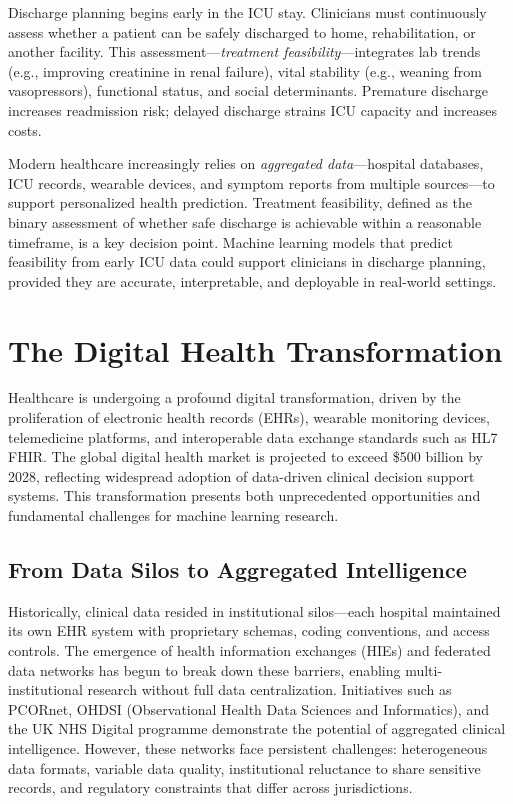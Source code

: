 Discharge planning begins early in the ICU stay. Clinicians must continuously assess whether a patient can be safely discharged to home, rehabilitation, or another facility. This assessment---\emph{treatment feasibility}---integrates lab trends (e.g., improving creatinine in renal failure), vital stability (e.g., weaning from vasopressors), functional status, and social determinants. Premature discharge increases readmission risk; delayed discharge strains ICU capacity and increases costs.

Modern healthcare increasingly relies on \emph{aggregated data}---hospital databases, ICU records, wearable devices, and symptom reports from multiple sources---to support personalized health prediction. Treatment feasibility, defined as the binary assessment of whether safe discharge is achievable within a reasonable timeframe, is a key decision point. Machine learning models that predict feasibility from early ICU data could support clinicians in discharge planning, provided they are accurate, interpretable, and deployable in real-world settings.

\section{The Digital Health Transformation}

Healthcare is undergoing a profound digital transformation, driven by the proliferation of electronic health records (EHRs), wearable monitoring devices, telemedicine platforms, and interoperable data exchange standards such as HL7 FHIR. The global digital health market is projected to exceed \$500 billion by 2028, reflecting widespread adoption of data-driven clinical decision support systems. This transformation presents both unprecedented opportunities and fundamental challenges for machine learning research.

\subsection{From Data Silos to Aggregated Intelligence}

Historically, clinical data resided in institutional silos---each hospital maintained its own EHR system with proprietary schemas, coding conventions, and access controls. The emergence of health information exchanges (HIEs) and federated data networks has begun to break down these barriers, enabling multi-institutional research without full data centralization. Initiatives such as PCORnet, OHDSI (Observational Health Data Sciences and Informatics), and the UK NHS Digital programme demonstrate the potential of aggregated clinical intelligence. However, these networks face persistent challenges: heterogeneous data formats, variable data quality, institutional reluctance to share sensitive records, and regulatory constraints that differ across jurisdictions.

